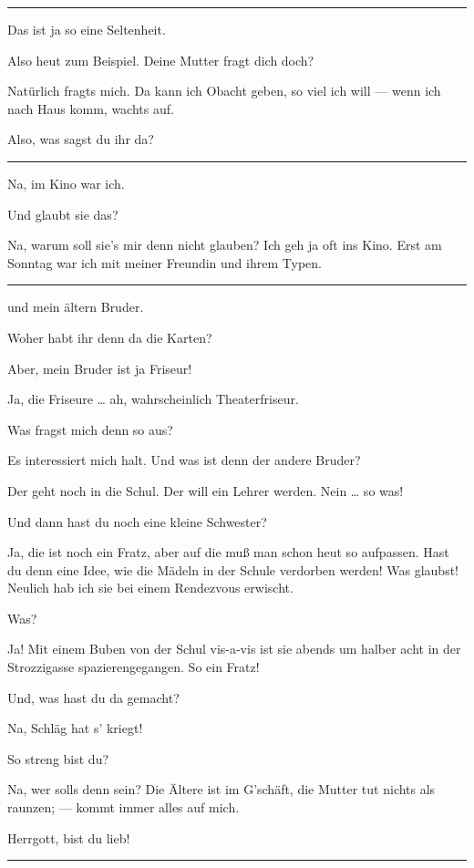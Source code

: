 \documentclass[
	final,
	a4paper,
	ngerman,
	mpinclude = true, %
	twoside = true,
	open = right,
	cleardoublepage = plain,
	DIV = 13,
	BCOR = 1cm,
	titlepage = firstiscover,
	]{scrbook}
\newenvironment{deletion}{%
		\vspace{0.25\baselineskip}
		\hrule
		\vspace{0.25\baselineskip}
		\color{darkgray}
	}{
		\color{black}
		\vspace{0.25\baselineskip}
		\hrule 
		\vspace{0.25\baselineskip}
	}
\newcommand{\thecharacter}[1]{\textup{\textsc{#1}}\xspace}
\newcommand{\thegatte}{\thecharacter{Christian}}
\newcommand{\thesuesse}{\thecharacter{Lola}}
\newcommand{\character}[1]{\item[#1:]}
\newcommand{\gatte}{\character{\thegatte}}
\newcommand{\suesse}{\character{\thesuesse}}
\begin{document}
\begin{play}
	\begin{deletion}
	\suesse
	Das ist ja so eine Seltenheit.

	\gatte
	Also heut zum Beispiel. Deine Mutter fragt dich doch?

	\suesse
	Natürlich fragts mich. Da kann ich Obacht geben, so viel ich will --- wenn ich nach Haus komm, wachts auf.

	\gatte
	Also, was sagst du ihr da?
	\end{deletion}

	\suesse
	Na, im Kino war ich.

	\gatte
	Und glaubt sie das?

	\suesse
	Na, warum soll sie's mir denn nicht glauben? Ich geh ja oft ins Kino. Erst am Sonntag war ich mit meiner Freundin und ihrem Typen.
	\begin{deletion}
	und mein ältern Bruder.

	\gatte
	Woher habt ihr denn da die Karten?

	\suesse
	Aber, mein Bruder ist ja Friseur!

	\gatte
	Ja, die Friseure \ldots{} ah, wahrscheinlich Theaterfriseur.

	\suesse
	Was fragst mich denn so aus?

	\gatte
	Es interessiert mich halt. Und was ist denn der andere Bruder?

	\suesse
	Der geht noch in die Schul. Der will ein Lehrer werden. Nein \ldots{} so was!

	\gatte
	Und dann hast du noch eine kleine Schwester?

	\suesse
	Ja, die ist noch ein Fratz, aber auf die muß man schon heut so aufpassen. Hast du denn eine Idee, wie die Mädeln in der Schule verdorben werden! Was glaubst! Neulich hab ich sie bei einem Rendezvous erwischt.

	\gatte
	Was?

	\suesse
	Ja! Mit einem Buben von der Schul vis-a-vis ist sie abends um halber acht in der Strozzigasse spazierengegangen. So ein Fratz!

	\gatte
	Und, was hast du da gemacht?

	\suesse
	Na, Schläg hat s' kriegt!

	\gatte
	So streng bist du?

	\suesse
	Na, wer solls denn sein? Die Ältere ist im G'schäft, die Mutter tut nichts als raunzen; --- kommt immer alles auf mich.

	\gatte
	Herrgott, bist du lieb!
	\end{deletion}


\end{play}
\end{document}
